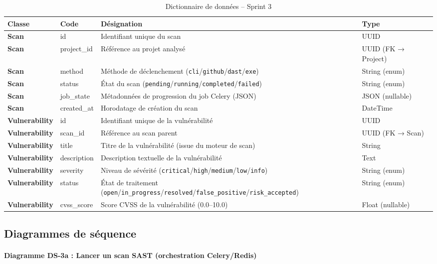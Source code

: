 \begin{table}[H]
\centering
\caption{Dictionnaire de données -- Sprint 3}
\label{tab:dict-sprint3}
\small
\renewcommand{\arraystretch}{1.3}
\begin{tabularx}{\textwidth}{>{\bfseries}p{2.8cm} p{3cm} X p{2.5cm}}
\hline
\rowcolor{gray!15}
\textbf{Classe} & \textbf{Code} & \textbf{Désignation} & \textbf{Type} \\
\hline
Scan & id & Identifiant unique du scan & UUID \\
Scan & project\_id & Référence au projet analysé & UUID (FK → Project) \\
Scan & method & Méthode de déclenchement (\texttt{cli}/\texttt{github}/\texttt{dast}/\texttt{exe}) & String (enum) \\
Scan & status & État du scan (\texttt{pending}/\texttt{running}/\texttt{completed}/\texttt{failed}) & String (enum) \\
Scan & job\_state & Métadonnées de progression du job Celery (JSON) & JSON (nullable) \\
Scan & created\_at & Horodatage de création du scan & DateTime \\
\hline
Vulnerability & id & Identifiant unique de la vulnérabilité & UUID \\
Vulnerability & scan\_id & Référence au scan parent & UUID (FK → Scan) \\
Vulnerability & title & Titre de la vulnérabilité (issue du moteur de scan) & String \\
Vulnerability & description & Description textuelle de la vulnérabilité & Text \\
Vulnerability & severity & Niveau de sévérité (\texttt{critical}/\texttt{high}/\texttt{medium}/\texttt{low}/\texttt{info}) & String (enum) \\
Vulnerability & status & État de traitement (\texttt{open}/\texttt{in\_progress}/\texttt{resolved}/\texttt{false\_positive}/\texttt{risk\_accepted}) & String (enum) \\
Vulnerability & cvss\_score & Score CVSS de la vulnérabilité (0.0--10.0) & Float (nullable) \\
\hline
\end{tabularx}
\end{table}

\subsection{Diagrammes de séquence}

\paragraph{Diagramme DS-3a : Lancer un scan SAST (orchestration Celery/Redis)}


